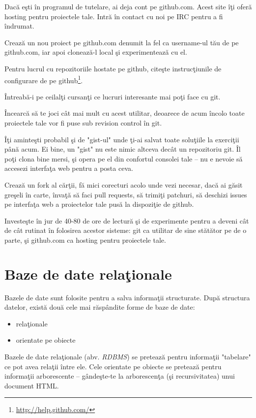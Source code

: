 \begin{Exercise}[title={A taste of git}]
Dacă eşti în programul de tutelare, ai deja cont pe github.com.
Acest site îţi oferă hosting pentru proiectele tale. Intră
în contact cu noi pe IRC pentru a fi îndrumat.

Crează un nou proiect pe github.com denumit la fel ca username-ul
tău de pe github.com, iar apoi clonează-l local şi experimentează
cu el.

Pentru lucrul cu repozitoriile hostate pe github, citeşte instrucţiunile
de configurare de pe github\footnote{\url{http://help.github.com/}}.

Întreabă-i pe ceilalţi cursanţi ce lucruri interesante mai poţi face
cu git.

Încearcă să te joci cât mai mult cu acest utilitar, deoarece de acum
încolo toate proiectele tale vor fi puse sub revision control în git.

Îţi aminteşti probabil şi de "gist-ul" unde ţi-ai salvat toate soluţiile
la exerciţii până acum. Ei bine, un "gist" nu este nimic altceva decât
un repozitoriu git. Îl poţi clona bine mersi, şi opera pe el
din confortul consolei tale -- nu e nevoie să accesezi interfaţa
web pentru a posta ceva.

Crează un fork al cărţii, fă mici corecturi acolo unde vezi necesar,
dacă ai găsit greşeli în carte, învaţă să faci pull
requests, să trimiţi patchuri, să deschizi issues pe interfaţa web
a proiectelor tale pusă la dispoziţie de github.

Investeşte în jur de 40-80 de ore de lectură şi de experimente pentru
a deveni cât de cât rutinat în folosirea acestor sisteme: git
ca utilitar de sine stătător pe de o parte, şi github.com ca
hosting pentru proiectele tale.
\end{Exercise}

\section{Baze de date relaţionale}
Bazele de date sunt folosite pentru a salva informaţii structurate.
După structura datelor, există două cele mai răspândite forme de
baze de date:
\begin{itemize}
\item relaţionale
\item orientate pe obiecte
\end{itemize}
Bazele de date relaţionale (abv. \textsl{RDBMS}) se pretează pentru informaţii "tabelare"
ce pot avea relaţii între ele. Cele orientate pe obiecte se pretează
pentru informaţii arborescente -- gândeşte-te la arborescenţa
(şi recursivitatea) unui document HTML.



